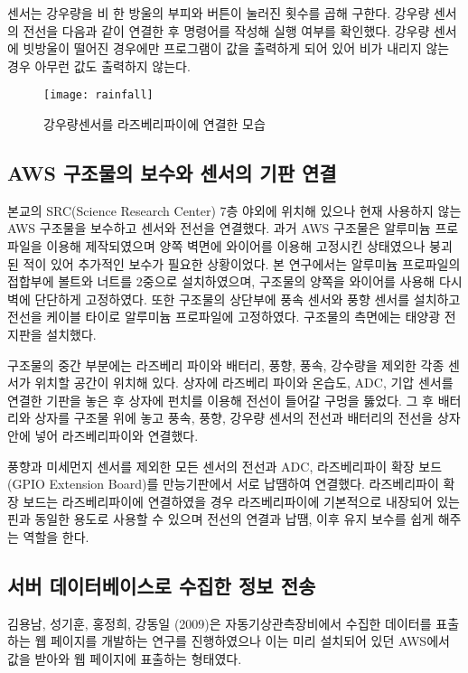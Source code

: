 센서는 강우량을 비 한 방울의 부피와 버튼이 눌러진 횟수를 곱해 구한다. 강우량 센서의 전선을 다음과 같이 연결한 후 명령어를 작성해 실행 여부를 확인했다. 강우량 센서에 빗방울이 떨어진 경우에만 프로그램이 값을 출력하게 되어 있어 비가 내리지 않는 경우 아무런 값도 출력하지 않는다.

\begin{figure}[htbp]
	\centering
	\texttt{[image: rainfall]}
	\caption{강우량센서를 라즈베리파이에 연결한 모습}
	\label{RAINFALL}
\end{figure}

\subsection{AWS 구조물의 보수와 센서의 기판 연결}
본교의 SRC(Science Research Center) 7층 야외에 위치해 있으나 현재 사용하지 않는 AWS 구조물을 보수하고 센서와 전선을 연결했다. 과거 AWS 구조물은 알루미늄 프로파일을 이용해 제작되였으며 양쪽 벽면에 와이어를 이용해 고정시킨 상태였으나 붕괴된 적이 있어 추가적인 보수가 필요한 상황이었다. 본 연구에서는 알루미늄 프로파일의 접합부에 볼트와 너트를 2중으로 설치하였으며, 구조물의 양쪽을 와이어를 사용해 다시 벽에 단단하게 고정하였다. 또한 구조물의 상단부에 풍속 센서와 풍향 센서를 설치하고 전선을 케이블 타이로 알루미늄 프로파일에 고정하였다. 구조물의 측면에는 태양광 전지판을 설치했다. 

구조물의 중간 부분에는 라즈베리 파이와 배터리, 풍향, 풍속, 강수량을 제외한 각종 센서가 위치할 공간이 위치해 있다. 상자에 라즈베리 파이와 온습도, ADC, 기압 센서를 연결한 기판을 놓은 후 상자에 펀치를 이용해 전선이 들어갈 구멍을 뚫었다. 그 후 배터리와 상자를 구조물 위에 놓고 풍속, 풍향, 강우량 센서의 전선과 배터리의 전선을 상자 안에 넣어 라즈베리파이와 연결했다.

풍향과 미세먼지 센서를 제외한 모든 센서의 전선과 ADC, 라즈베리파이 확장 보드(GPIO Extension Board)를 만능기판에서 서로 납땜하여 연결했다. 라즈베리파이 확장 보드는 라즈베리파이에 연결하였을 경우 라즈베리파이에 기본적으로 내장되어 있는 핀과 동일한 용도로 사용할 수 있으며 전선의 연결과 납땜, 이후 유지 보수를 쉽게 해주는 역할을 한다.

\subsection{서버 데이터베이스로 수집한 정보 전송}
김용남, 성기훈, 홍정희, 강동일 (2009)은 자동기상관측장비에서 수집한 데이터를 표출하는 웹 페이지를 개발하는 연구를 진행하였으나 이는 미리 설치되어 있던 AWS에서 값을 받아와 웹 페이지에 표출하는 형태였다\cite{Ref2}. 

